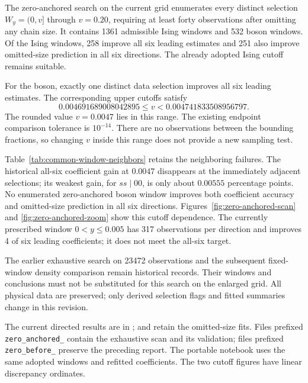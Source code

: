 The zero-anchored search on the current grid enumerates every distinct selection $W_y=(0,v]$ through $v=0.20$, requiring at least forty observations after omitting any chain size. It contains 1361 admissible Ising windows and 532 boson windows. Of the Ising windows, 258 improve all six leading estimates and 251 also improve omitted-size prediction in all six directions. The already adopted Ising cutoff remains suitable.

For the boson, exactly one distinct data selection improves all six leading estimates. The corresponding upper cutoffs satisfy \begin{equation}0.004691689008042895\leq v<0.004741833508956797.\label{eq:zero-equivalent-cutoffs}\end{equation} The rounded value $v=0.0047$ lies in this range. The existing endpoint comparison tolerance is $10^{-14}$. There are no observations between the bounding fractions, so changing $v$ inside this range does not provide a new sampling test.

Table~\ref{tab:common-window-neighbors} retains the neighboring failures. The historical all-six coefficient gain at $0.0047$ disappears at the immediately adjacent selections; its weakest gain, for $ss\mid00$, is only about $0.00555$ percentage points. No enumerated zero-anchored boson window improves both coefficient accuracy and omitted-size prediction in all six directions. Figures~\ref{fig:zero-anchored-scan} and \ref{fig:zero-anchored-zoom} show this cutoff dependence. The currently prescribed window $0<y\leq0.005$ has 317 observations per direction and improves 4 of six leading coefficients; it does not meet the all-six target.

The earlier exhaustive search on 23472 observations and the subsequent fixed-window density comparison remain historical records. Their windows and conclusions must not be substituted for this search on the enlarged grid. All physical data are preserved; only derived selection flags and fitted summaries change in this revision.

\begin{sloppypar}The current directed results are in ;  and  retain the omitted-size fits. Files prefixed \texttt{zero\_anchored\_} contain the exhaustive scan and its validation; files prefixed \texttt{zero\_before\_} preserve the preceding report. The portable  notebook uses the same adopted windows and refitted coefficients. The two cutoff figures have linear discrepancy ordinates.\end{sloppypar}
